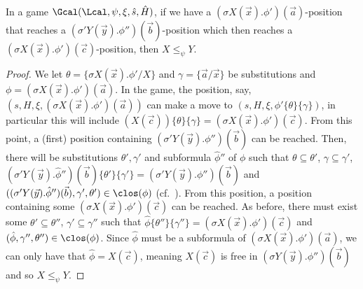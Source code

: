 \begin{lemma}\label{lem:parityNom2}
	In a game $\Gcal(\Lcal, \psi, \xi, \hat s, \hat H)$, 
	if we have a $(\sigma X(\vec x).\phi')(\vec a)$-position  that reaches a $(\sigma' Y(\vec y).\phi'')(\vec b)$-position which then reaches a $(\sigma X(\vec x).\phi')(\vec c)$-position, then $X \le_\psi Y$.  
\end{lemma}\begin{proof}
	We let $\theta = \{\sigma X(\vec x).\phi'/ X\}$ and $\gamma = \{\vec a/ \vec x\}$ be substitutions and $\phi=(\sigma X(\vec x).\phi')(\vec a)$.
	In the game, the position, say, $(s, H, \xi, (\sigma X(\vec x).\phi')(\vec a))$ can make a move to $(s, H, \xi, \phi'\{\theta\}\{\gamma\})$, in particular this will include $(X(\vec c))\{\theta\}\{\gamma\} = (\sigma X(\vec x).\phi')(\vec c)$. 
	From this point, a (first) position containing $(\sigma' Y(\vec y).\phi'')(\vec b)$ can be reached.
	Then, there will be substitutions $\theta', \gamma'$ and subformula $\hat\phi''$ of $\phi$ such that $\theta \subseteq \theta'$, $\gamma \subseteq \gamma'$,
	$(\sigma'Y(\vec y).\hat \phi'')(\vec b)\{\theta'\}\{\gamma'\} = (\sigma' Y(\vec y).\phi'')(\vec b)$
	and 
	$((\sigma' Y(\vec y).\hat\phi'')(\vec b), \gamma', \theta') \in \clos(\phi)$
	(cf.~).
	From this position, a position containing some $(\sigma X(\vec x).\phi')(\vec c)$ can be reached.
	As before,
	there must exist some $\theta' \subseteq \theta''$, $\gamma' \subseteq \gamma''$ 
	such that $\hat \phi\{\theta''\}\{\gamma''\} = (\sigma X(\vec x).\phi')(\vec c)$ and $(\hat \phi, \gamma'', \theta'') \in \clos(\phi)$. 
	Since $\hat \phi$ must be a subformula of $(\sigma X(\vec x).\phi')(\vec a)$, we can only have that $\hat \phi = X(\vec c)$, 
	meaning $X(\vec c)$ is free in $(\sigma Y(\vec y).\phi'')(\vec b)$ and so $X \le_\psi Y$.
\end{proof}

\FnomSatPar*

